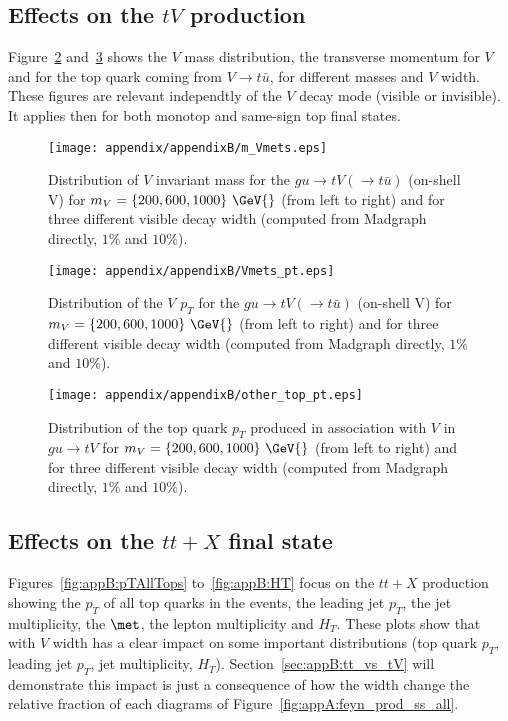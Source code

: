 \subsection{Effects on the $tV$ production}

Figure~\ref{fig:appB:pTV} and~\ref{fig:appB:pTtop} shows the $V$ mass distribution, the transverse momentum for $V$ and for the top quark coming from $V\to t\bar{u}$, for different masses and $V$ width. 
These figures are relevant independtly of the $V$ decay mode (visible or invisible). It applies then for both monotop and same-sign top final states.

\begin{figure}[!h!tpd]
  \centering
  \texttt{[image: appendix/appendixB/m\_Vmets.eps]}
  \caption{
    Distribution of $V$ invariant mass for the $gu\to tV(\to t\bar{u})$ (on-shell V) 
    for $m_V = \{200, 600, 1000\}~\GeV{}$ (from left to right) and for three different
    visible decay width (computed from Madgraph directly, $1\%$ and $10\%$).
  }   
  \label{fig:appB:Vmass}
\end{figure}


\begin{figure}[!h!tpd]
  \centering
  \texttt{[image: appendix/appendixB/Vmets\_pt.eps]}
  \caption{
    Distribution of the $V$ $p_T$ for the $gu\to tV(\to t\bar{u})$ (on-shell V) for $m_V = \{200, 600, 1000\}~\GeV{}$ (from left to right) and for three different
    visible decay width (computed from Madgraph directly, $1\%$ and $10\%$).
  }
  \label{fig:appB:pTV}
\end{figure}


\begin{figure}[!h!tpd]
  \centering
  \texttt{[image: appendix/appendixB/other\_top\_pt.eps]}
  \caption{
    Distribution of the top quark $p_T$ produced in association with $V$ in $gu\to tV$ for $m_V = \{200, 600, 1000\}~\GeV{}$ (from left to right) and for three different
    visible decay width (computed from Madgraph directly, $1\%$ and $10\%$).
  }
  \label{fig:appB:pTtop}
\end{figure}



\subsection{Effects on the $tt+X$ final state}
\label{sec:appB:ttXimpact}

Figures~\ref{fig:appB:pTAllTops} to~\ref{fig:appB:HT} focus on the $tt+X$ production showing the $p_T$ of all top quarks in the events, 
the leading jet $p_T$, the jet multiplicity, the $\met$, the lepton multiplicity and $H_T$. These plots
show that with $V$ width has a clear impact on some important distributions (top quark $p_T$, leading jet $p_T$, jet multiplicity, $H_T$). Section~\ref{sec:appB:tt_vs_tV} will 
demonstrate this impact is just a consequence of how the width change the relative fraction of each diagrams of Figure~\ref{fig:appA:feyn_prod_ss_all}.

